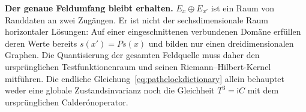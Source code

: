 \textbf{Der genaue Feldumfang bleibt erhalten.}
$E_x\oplus E_{x'}$ ist ein Raum von Randdaten an zwei Zugängen. Er ist nicht der sechsdimensionale Raum horizontaler Lösungen: Auf einer eingeschnittenen verbundenen Domäne erfüllen deren Werte bereits $s(x')=Ps(x)$ und bilden nur einen dreidimensionalen Graphen. Die Quantisierung der gesamten Feldquelle muss daher den ursprünglichen Testfunktionenraum und seinen Riemann--Hilbert-Kernel mitführen. Die endliche Gleichung~\eqref{eq:pathclockdictionary} allein behauptet weder eine globale Zustandsinvarianz noch die Gleichheit $T^3=\mathsf iC$ mit dem ursprünglichen Calder\'onoperator.

